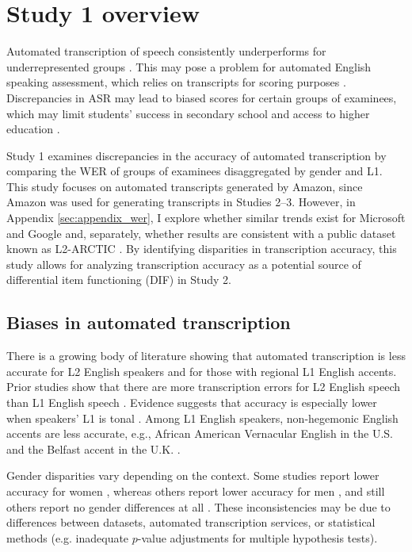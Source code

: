 \documentclass [PhD] {uclathes}
\begin{document}
\section{Study 1 overview}

Automated transcription of speech consistently underperforms for underrepresented groups \citep{dichristofano2023, hutiri2022}. This may pose a problem for automated English speaking assessment, which relies on transcripts for scoring purposes \citep{zechner2019automated, johnston2019using}. Discrepancies in ASR may lead to biased scores for certain groups of examinees, which may limit students’ success in secondary school \citep{johnson2020} and access to higher education \citep{johnson2019effects}. 

Study 1 examines discrepancies in the accuracy of automated transcription by comparing the WER of groups of examinees disaggregated by gender and L1. This study focuses on automated transcripts generated by Amazon, since Amazon was used for generating transcripts in Studies 2–3. However, in Appendix \ref{sec:appendix_wer}, I explore whether similar trends exist for Microsoft and Google and, separately, whether results are consistent with a public dataset known as L2-ARCTIC \citep[Appendix \ref{sec:appendix_l2};][]{zhao2018l2}. By identifying disparities in transcription accuracy, this study allows for analyzing transcription accuracy as a potential source of differential item functioning (DIF) in Study 2.

\subsection{Biases in automated transcription}

There is a growing body of literature showing that automated transcription is less accurate for L2 English speakers and for those with regional L1 English accents. Prior studies show that there are more transcription errors for L2 English speech than L1 English speech \citep{dichristofano2023, markl2022, meyer2020}. Evidence suggests that accuracy is especially lower when speakers’ L1 is tonal \citep{chan2022training}. Among L1 English speakers, non-hegemonic English accents are less accurate, e.g., African American Vernacular English in the U.S. \citep{koenecke2020} and the Belfast accent in the U.K. \citep{markl2022}.

Gender disparities vary depending on the context. Some studies report lower accuracy for women \citep{tatman2017a, hutiri2022}, whereas others report lower accuracy for men \citep{dichristofano2023, zuluaga2023, markl2022}, and still others report no gender differences at all \citep{chan2022training, tatman2017b}. These inconsistencies may be due to differences between datasets, automated transcription services, or statistical methods (e.g. inadequate $p$-value adjustments for multiple hypothesis tests).
\end{document}
